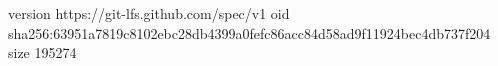 version https://git-lfs.github.com/spec/v1
oid sha256:63951a7819c8102ebc28db4399a0fefc86acc84d58ad9f11924bec4db737f204
size 195274
